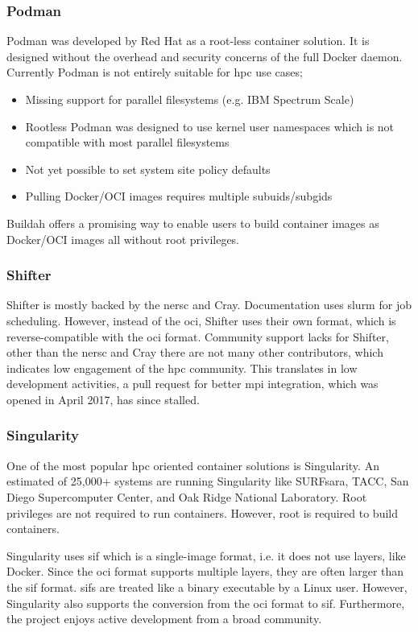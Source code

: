 \documentclass[conference]{IEEEtran}
\begin{document}
\subsubsection{Podman}
Podman was developed by Red Hat as a root-less container solution. It is designed without the overhead and security concerns of the full Docker daemon. Currently Podman is not entirely suitable for \gls{hpc} use cases;
\begin{itemize}
    \item Missing support for parallel filesystems (e.g. IBM Spectrum Scale)
    \item Rootless Podman was designed to use kernel user namespaces which is not compatible with most parallel filesystems
    \item Not yet possible to set system site policy defaults
    \item Pulling Docker/OCI images requires multiple subuids/subgids
\end{itemize}
Buildah offers a promising way to enable users to build container images as Docker/OCI images all without root privileges.


\subsubsection{Shifter}
Shifter is mostly backed by the \gls{nersc} and Cray. Documentation uses \gls{slurm} for job scheduling. However, instead of the \gls{oci}, Shifter uses their own format, which is reverse-compatible with the \gls{oci} format. Community support lacks for Shifter, other than the \gls{nersc} and Cray there are not many other contributors, which indicates low engagement of the \gls{hpc} community. This translates in low development activities, a pull request for better \gls{mpi} integration, which was opened in April 2017, has since stalled.


\subsubsection{Singularity}
One of the most popular \gls{hpc} oriented container solutions is Singularity. An estimated of 25,000+ systems are running Singularity like SURFsara, TACC, San Diego Supercomputer Center, and Oak Ridge National Laboratory. Root privileges are not required to run containers. However, root is required to build containers.

Singularity uses \gls{sif} which is a single-image format, i.e. it does not use layers, like Docker. Since the \gls{oci} format supports multiple layers, they are often larger than the \gls{sif} format. \glspl{sif} are treated like a binary executable by a Linux user. However, Singularity also supports the conversion from the \gls{oci} format to \gls{sif}. Furthermore, the project enjoys active development from a broad community.
\end{document}

